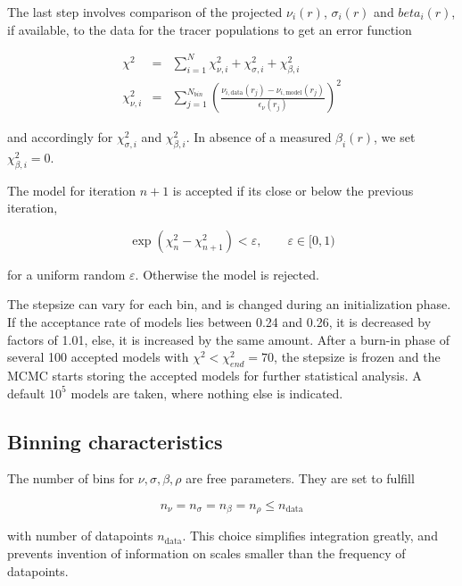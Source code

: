 The last step involves comparison of the projected $\nu_i(r)$, $\sigma_i(r)$ and
$beta_i(r)$, if available, to the data for the tracer populations to
get an error function

\begin{eqnarray}
\chi^2 &=& \sum_{i=1}^N \chi_{\nu,i}^2 + \chi_{\sigma,i}^2 + \chi_{\beta,i}^2\\
\chi_{\nu,i}^2 &=& \sum_{j=1}^{N_{bin}} \left(\frac{\nu_{i,\text{data}}(r_j)-\nu_{i,\text{model}}(r_j)}{\epsilon_\nu(r_j)}\right)^2
\end{eqnarray}

and accordingly for $\chi_{\sigma,i}^2$ and $\chi_{\beta,i}^2$. In
absence of a measured $\beta_i(r)$, we set $\chi_{\beta,i}^2=0$.

The model for iteration $n+1$ is accepted if its close or below the previous iteration,

\begin{equation}
\exp(\chi^2_n - \chi^2_{n+1}) < \varepsilon,\qquad \varepsilon\in [0,1)
\end{equation}

for a uniform random $\varepsilon$. Otherwise the model is rejected.

The stepsize can vary for each bin, and is changed during an
initialization phase. If the acceptance rate of models lies between
0.24 and 0.26, it is decreased by factors of 1.01, else, it is
increased by the same amount. After a burn-in phase of several 100
accepted models with $\chi^2<\chi_{end}^2 = 70$, the stepsize is
frozen and the MCMC starts storing the accepted models for further
statistical analysis. A default $10^5$ models are taken, where nothing
else is indicated.



\subsection{Binning characteristics}

The number of bins for $\nu, \sigma, \beta, \rho$ are free
parameters. They are set to fulfill

\begin{equation}
n_\nu = n_\sigma = n_\beta = n_\rho \leq n_{\text{data}}
\end{equation}

with number of datapoints $n_{\text{data}}$. This choice simplifies
integration greatly, and prevents invention of information on scales
smaller than the frequency of datapoints.

